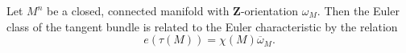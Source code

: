 Let $M^n$ be a closed, connected manifold with $\mathbf{Z}$-orientation $\omega_M$. Then the Euler class of the tangent bundle is related to the Euler characteristic by the relation
$$e(\tau(M)) = \chi(M) \overline{\omega}_M.$$
